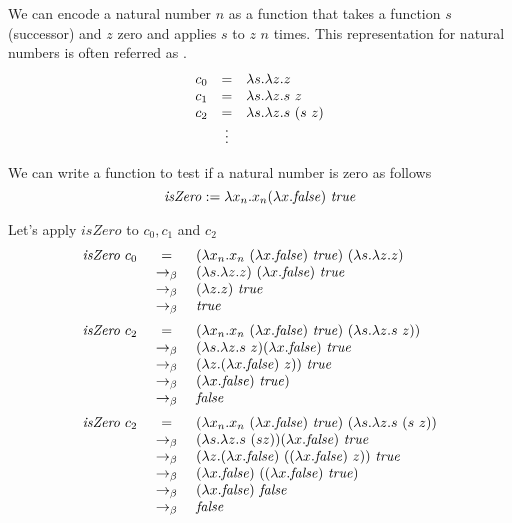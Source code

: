 \begin{gram}
We can encode a natural number $n$ as a
function that takes a function $s$ (successor) and $z$ zero and
applies $s$ to $z$ $n$ times.
%
This representation for natural numbers is often referred as
%
.  
%
\[
\begin{array}{rcl}
c_0 & = & \lambda s. \lambda z. z\\
c_1 & = & \lambda s. \lambda z. s~z \\
c_2 & = & \lambda s. \lambda z. s~(s~z)\\
    & \vdots & 
\end{array}
\]
\end{gram}


\begin{flex}
\begin{gram}
We can write a function to test if a natural number is zero as follows
\[
\mathit{isZero} := \lambda x_n.  x_n  (\lambda x. \mathit{false})~\mathit{true}
\]
\end{gram}

\begin{example}
Let's apply $isZero$ to $c_0, c_1$ and $c_2$
\[
\begin{array}{rcl}
\mathit{isZero}~ c_0 & =     & (\lambda x_n.  x_n~ (\lambda x. \mathit{false})~\mathit{true})~ (\lambda s. \lambda z. z)\\
           & ~\rightarrow_{\beta}~ &   (\lambda s. \lambda z. z)~ (\lambda x. \mathit{false})~\mathit{true}\\
           & ~\rightarrow_{\beta}~ &  (\lambda z. z)~\mathit{true}\\
           & ~\rightarrow_{\beta}~ &  \mathit{true}\\[2mm]

\mathit{isZero}~ c_2 & =     & (\lambda x_n.  x_n~  (\lambda x. \mathit{false})~\mathit{true})~ (\lambda s. \lambda z. s~z))\\
           & ~\rightarrow_{\beta}~ &   (\lambda s. \lambda z. s~ z) (\lambda x. \mathit{false})~\mathit{true}\\
           & ~\rightarrow_{\beta}~ &   (\lambda z. (\lambda x. \mathit{false})~ z))~\mathit{true}\\
           & ~\rightarrow_{\beta}~ &   (\lambda x. \mathit{false})~\mathit{true})\\
           & ~\rightarrow_{\beta}~ &   \mathit{false}\\[2mm]

\mathit{isZero}~ c_2 & =     & (\lambda x_n.  x_n~  (\lambda x. \mathit{false})~\mathit{true})~ (\lambda s. \lambda z. s~ (s~z))\\
           & ~\rightarrow_{\beta}~ &   (\lambda s. \lambda z. s~ (s z)) (\lambda x. \mathit{false})~\mathit{true}\\
           & ~\rightarrow_{\beta}~ &   (\lambda z. (\lambda x. \mathit{false})~ ((\lambda x. \mathit{false})~ z))~\mathit{true}\\
           & ~\rightarrow_{\beta}~ &   (\lambda x. \mathit{false})~ ((\lambda x. \mathit{false})~ \mathit{true})\\
           & ~\rightarrow_{\beta}~ &   (\lambda x. \mathit{false})~ \mathit{false}\\
           & ~\rightarrow_{\beta}~ &   \mathit{false}
\end{array}
\]
\end{example}
\end{flex}

